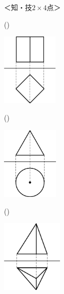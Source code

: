 \documentclass[
  12pt,a4paper,lualatex,ja=standard]{bxjsarticle}
\begin{document}
\begin{flushleft}
%
\begin{flushright}%
\footnotesize{＜知・技$2 \times 4$点＞}%
\end{flushright}%


\begin{multicols}{2}
()\hspace{2.5pt}

\begin{center}
\def\@captype{figure}
\includegraphics[height=35mm]{img/img3.jpg}

\end{center}

\columnbreak

()\hspace{2.5pt}

\begin{center}
\def\@captype{figure}
\includegraphics[height=35mm]{img/img4.jpg}

\end{center}

\end{multicols}

\vfill

\begin{multicols}{2}
()\hspace{2.5pt}

\begin{center}
\def\@captype{figure}
\includegraphics[height=35mm]{img/img5.jpg}


\end{center}
\end{multicols}
\end{flushleft}
\end{document}
